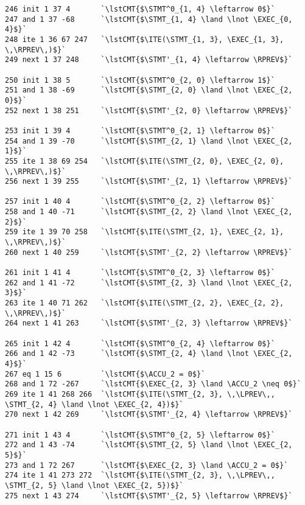 \begin{lstlisting}[style=btor2]
246 init 1 37 4       `\lstCMT{$\STMT^0_{1, 4} \leftarrow 0$}`
247 and 1 37 -68      `\lstCMT{$\STMT_{1, 4} \land \lnot \EXEC_{0, 4}$}`
248 ite 1 36 67 247   `\lstCMT{$\ITE(\STMT_{1, 3}, \EXEC_{1, 3}, \,\RPREV\,)$}`
249 next 1 37 248     `\lstCMT{$\STMT'_{1, 4} \leftarrow \RPREV$}`

250 init 1 38 5       `\lstCMT{$\STMT^0_{2, 0} \leftarrow 1$}`
251 and 1 38 -69      `\lstCMT{$\STMT_{2, 0} \land \lnot \EXEC_{2, 0}$}`
252 next 1 38 251     `\lstCMT{$\STMT'_{2, 0} \leftarrow \RPREV$}`

253 init 1 39 4       `\lstCMT{$\STMT^0_{2, 1} \leftarrow 0$}`
254 and 1 39 -70      `\lstCMT{$\STMT_{2, 1} \land \lnot \EXEC_{2, 1}$}`
255 ite 1 38 69 254   `\lstCMT{$\ITE(\STMT_{2, 0}, \EXEC_{2, 0}, \,\RPREV\,)$}`
256 next 1 39 255     `\lstCMT{$\STMT'_{2, 1} \leftarrow \RPREV$}`

257 init 1 40 4       `\lstCMT{$\STMT^0_{2, 2} \leftarrow 0$}`
258 and 1 40 -71      `\lstCMT{$\STMT_{2, 2} \land \lnot \EXEC_{2, 2}$}`
259 ite 1 39 70 258   `\lstCMT{$\ITE(\STMT_{2, 1}, \EXEC_{2, 1}, \,\RPREV\,)$}`
260 next 1 40 259     `\lstCMT{$\STMT'_{2, 2} \leftarrow \RPREV$}`

261 init 1 41 4       `\lstCMT{$\STMT^0_{2, 3} \leftarrow 0$}`
262 and 1 41 -72      `\lstCMT{$\STMT_{2, 3} \land \lnot \EXEC_{2, 3}$}`
263 ite 1 40 71 262   `\lstCMT{$\ITE(\STMT_{2, 2}, \EXEC_{2, 2}, \,\RPREV\,)$}`
264 next 1 41 263     `\lstCMT{$\STMT'_{2, 3} \leftarrow \RPREV$}`

265 init 1 42 4       `\lstCMT{$\STMT^0_{2, 4} \leftarrow 0$}`
266 and 1 42 -73      `\lstCMT{$\STMT_{2, 4} \land \lnot \EXEC_{2, 4}$}`
267 eq 1 15 6         `\lstCMT{$\ACCU_2 = 0$}`
268 and 1 72 -267     `\lstCMT{$\EXEC_{2, 3} \land \ACCU_2 \neq 0$}`
269 ite 1 41 268 266  `\lstCMT{$\ITE(\STMT_{2, 3}, \,\LPREV\,, \STMT_{2, 4} \land \lnot \EXEC_{2, 4})$}`
270 next 1 42 269     `\lstCMT{$\STMT'_{2, 4} \leftarrow \RPREV$}`

271 init 1 43 4       `\lstCMT{$\STMT^0_{2, 5} \leftarrow 0$}`
272 and 1 43 -74      `\lstCMT{$\STMT_{2, 5} \land \lnot \EXEC_{2, 5}$}`
273 and 1 72 267      `\lstCMT{$\EXEC_{2, 3} \land \ACCU_2 = 0$}`
274 ite 1 41 273 272  `\lstCMT{$\ITE(\STMT_{2, 3}, \,\LPREV\,, \STMT_{2, 5} \land \lnot \EXEC_{2, 5})$}`
275 next 1 43 274     `\lstCMT{$\STMT'_{2, 5} \leftarrow \RPREV$}`
\end{lstlisting}

